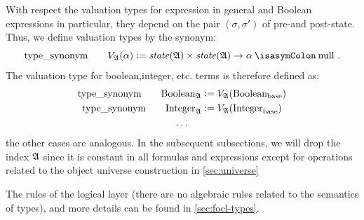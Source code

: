 With respect the valuation types for \OCL expression in general and Boolean 
expressions in particular, they depend on the pair $(\sigma, \sigma')$ of 
pre-and post-state. Thus, we define valuation types by the synonym:
\begin{equation}
\typesynonym \qquad  \V{\isaAA}{\alpha} \defeq \state{\isaAA} \times 
                                \state{\isaAA} \to \alpha \ofType \TCnull \mi{.}
\end{equation}
The valuation type for boolean,integer, etc. \OCL terms is therefore defined as:
\begin{gather*}
\mathrm{type\_synonym} \qquad \text{Boolean}_{\mathfrak{A}} \mathrel{\mathop:}=  V_{\mathfrak{A}}({\text{Boolean}_{\text{base}}}) \\
\mathrm{type\_synonym} \qquad \text{Integer}_{\mathfrak{A}} \mathrel{\mathop:}=  V_{\mathfrak{A}}({\text{Integer}_{\text{base}}}) \\
\ldots
\end{gather*}
the other cases are analogous. In the subsequent subsections, we will drop the 
index $\mathfrak{A}$ since it is constant in all formulas and expressions except for 
operations related to the object universe construction in \autoref{sec:universe}

The rules of the logical layer (there are no algebraic rules related to the 
semantics of types), and more details can be found in  \autoref{sec:focl-types}.

